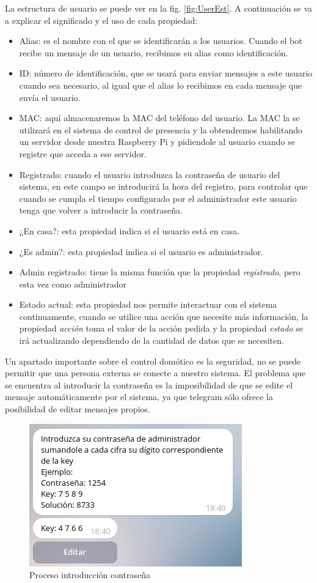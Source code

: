 \documentclass[10pt,journal,compsoc]{IEEEtran}
\begin{document}
La estructura de  usuario se puede ver en la fig. \ref{fig:UserEst}. A continuación se va a explicar el significado y el uso de cada propiedad:
\begin{itemize}
\item Alias: es el nombre con el que se identificarán a los usuarios. Cuando el bot recibe un mensaje de un usuario, recibimos su alias como identificación.
\item ID: número de identificación, que se usará para enviar mensajes a este usuario cuando sea necesario, al igual que el alias lo recibimos en cada mensaje que envía el usuario.
\item MAC: aquí almacenaremos la MAC del teléfono del usuario. La MAC la se utilizará en el sistema de control de presencia y la obtendremos habilitando un servidor desde nuestra Raspberry Pi y pidiendole al usuario cuando se registre que acceda a ese servidor.
\item Registrado: cuando el usuario introduzca la contraseña de usuario del sistema, en este campo se introducirá la hora del registro, para controlar que cuando se cumpla el tiempo configurado por el administrador este usuario tenga que volver a introducir la contraseña.
\item ¿En casa?: esta propiedad indica si el usuario está en casa. 
\item ¿Es admin?: esta propiedad indica si el usuario es administrador.
\item Admin registrado: tiene la misma función que la propiedad \textit{registrado}, pero esta vez como administrador 
\item Estado actual: esta propiedad nos permite interactuar con el sistema continuamente, cuando se utilice una acción que necesite más información, la propiedad \textit{acción} toma el valor de la acción pedida y la propiedad \textit{estado} se irá actualizando dependiendo de la cantidad de datos que se necesiten.
\end{itemize}

Un apartado importante sobre el control domótico es la seguridad, no se puede permitir que una persona externa se conecte a nuestro sistema. El problema que se encuentra al introducir la contraseña es la imposibilidad de que se edite el mensaje automáticamente por el sistema, ya que telegram sólo ofrece la posibilidad de editar mensajes propios. 

\begin{figure}[h]
\centering
\includegraphics[scale=0.5]{imgPass}
\caption{Proceso introducción contraseña}
\label{fig:imgPass}
\end{figure}
\end{document}

